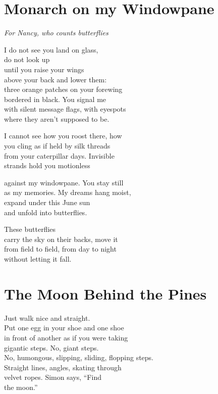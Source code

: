 \documentclass[twoside,10pt]{book}
\begin{document}
\clearpage
\section{Monarch on my Windowpane}

\emph{For Nancy, who counts butterflies}

I do not see you land on glass,\\
do not look up\\
until you raise your wings\\
above your back and lower them:\\
three orange patches on your forewing\\
bordered in black. You signal me\\
with silent message flags, with eyespots\\
where they aren't supposed to be.

I cannot see how you roost there, how\\
you cling as if held by silk threads\\
from your caterpillar days. Invisible\\
strands hold you motionless

against my windowpane. You stay still\\
as my memories. My dreams hang moist,\\
expand under this June sun\\
and unfold into butterflies.

These butterflies\\
carry the sky on their backs, move it\\
from field to field, from day to night\\
without letting it fall.


\clearpage
\section{The Moon Behind the Pines}

Just walk nice and straight.\\
Put one egg in your shoe and one shoe\\
in front of another as if you were taking\\
gigantic steps. No, giant steps.\\
No, humongous, slipping, sliding, flopping steps.\\
Straight lines, angles, skating through\\
velvet ropes. Simon says, ``Find\\
the moon.''
\end{document}
